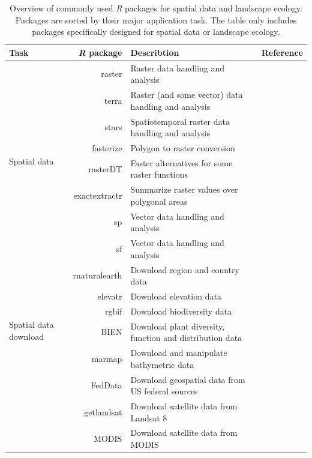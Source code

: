 \documentclass[smallextended]{svjour3}       %
\begin{document}
\begin{table}

\scriptsize 

\captionsetup{font=scriptsize}

\caption{Overview of commonly used \textit{R} packages for spatial data and landscape ecology. Packages are sorted by their major application task. The table only includes packages specifically designed for spatial data or landscape ecology.}

\begin{tabularx}{1.35\linewidth}{lrXr}

\hline
Task & \textit{R} package & Describtion & Reference \\
\hline
\multirow{8}{*}{Spatial data} & raster & Raster data handling and analysis & \cite{Hijmans2019} \\
& terra & Raster (and some vector) data handling and analysis & \cite{Hijmans2021} \\
& stars & Spatiotemporal raster data handling and analysis & \cite{Pebesma2019} \\
& fasterize & Polygon to raster conversion & \cite{Ross2020} \\
& rasterDT & Faster alternatives for some raster functions & \cite{OBrien2020} \\
& exactextractr & Summarize raster values over polygonal areas & \cite{Baston2020} \\
& sp & Vector data handling and analysis & \cite{Pebesma2005,Bivand2013} \\
& sf & Vector data handling and analysis & \cite{Pebesma2018} \\
\hline
\multirow{6}{*}{Spatial data download} & rnaturalearth & Download region and country data & \cite{South2017} \\
& elevatr & Download elevation data & \cite{Hollister2020} \\
& rgbif & Download biodiversity data & \cite{Chamberlain2017} \\
& BIEN & Download plant diversity, function and distribution data & \cite{Maitner2020} \\
& marmap & Download and manipulate bathymetric data & \cite{Pante2013} \\
& FedData & Download geospatial data from US federal sources & \cite{Bocinsky2019} \\
& getlandsat & Download satellite data from Landsat 8 & \cite{Chamberlain2018} \\
& MODIS & Download satellite data from MODIS & \cite{Mattiuzzi2020} \\

\end{tabularx}
\end{table}
\end{document}
